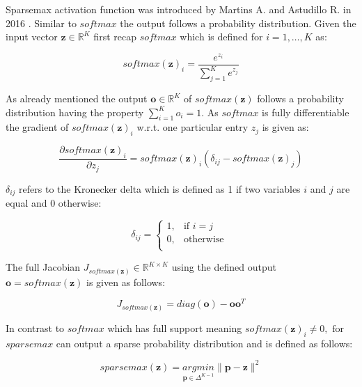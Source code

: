 \documentclass[../main.tex]{subfiles}
\begin{document}
Sparsemax activation function was introduced by Martins A. and Astudillo R. in 2016 \cite{martins_softmax_2016}. Similar to $softmax$ the output follows a probability distribution. Given the input vector $\mathbf{z} \in \mathbb{R}^K$ first recap $softmax$ which is defined for $i=1,\ldots,K$ as:

\begin{equation}
    softmax(\mathbf{z})_{i}=\frac{e^{z_i}}{\sum_{j=1}^{K}e^{z_j}}
\end{equation}

As already mentioned the output $\mathbf{o} \in \mathbb{R}^K$ of $softmax(\mathbf{z})$ follows a probability distribution having the property $\sum_{i=1}^{K}o_i = 1$. As $softmax$ is fully differentiable the gradient of $softmax(\mathbf{z})_i$ w.r.t. one particular entry $z_j$ is given as:

\begin{equation}
    \frac{\partial softmax(\mathbf{z})_i}{\partial z_j} = softmax(\mathbf{z})_i(\delta_{ij}-softmax(\mathbf{z})_j)
\end{equation}

$\delta_{ij}$ refers to the Kronecker delta which is defined as 1 if two variables $i$ and $j$ are equal and 0 otherwise:

\begin{equation}
    \delta_{ij}=
    \begin{cases}
        1,& \text{if } i=j \\
        0,& \text{otherwise } \\
    \end{cases}
\end{equation}

The full Jacobian $J_{softmax(\mathbf{z})} \in \mathbb{R}^{K \times K}$ using the defined output $\mathbf{o}=softmax(\mathbf{z})$ is given as follows:

\begin{equation}
    J_{softmax(\mathbf{z})}=diag(\mathbf{o})-\mathbf{o}\mathbf{o}^T
\end{equation}

In contrast to $softmax$ which has full support meaning $softmax(\mathbf{z})_i \ne 0, \text{ for }$ $sparsemax$ can output a sparse probability distribution and is defined as follows:

\begin{equation} \label{eq:sparsemax}
    sparsemax(\mathbf{z})=\underset{\mathbf{p} \in \Delta^{K-1}}{argmin} \lVert \mathbf{p} - \mathbf{z} \rVert ^ 2
\end{equation}
\end{document}
